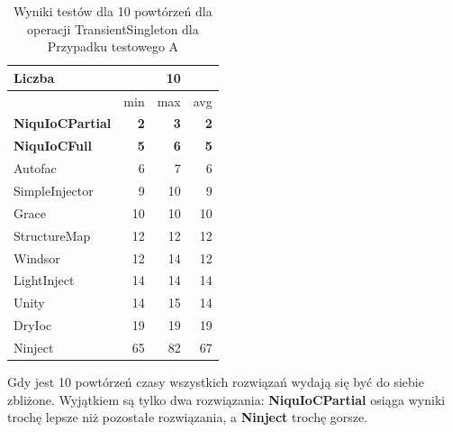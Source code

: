 \documentclass[12pt]{article}
\begin{document}
\begin{table}[H]
\captionsetup{belowskip=0pt,aboveskip=0pt}
\begin{center}
\begin{small}
	\begin{tabular}{ | l | r r r | }
    		\hline
Liczba & & 10 & \\ \hline
 & min & max & avg \\ \hline
\textbf{NiquIoCPartial} & \textbf{2} & \textbf{3} & \textbf{2} \\ \hline
\textbf{NiquIoCFull} & \textbf{5} & \textbf{6} & \textbf{5} \\ \hline
Autofac & 6 & 7 & 6 \\ \hline
SimpleInjector & 9 & 10 & 9 \\ \hline
Grace & 10 & 10 & 10 \\ \hline
StructureMap & 12 & 12 & 12 \\ \hline
Windsor & 12 & 14 & 12 \\ \hline
LightInject & 14 & 14 & 14 \\ \hline
Unity & 14 & 15 & 14 \\ \hline
DryIoc & 19 & 19 & 19 \\ \hline
Ninject & 65 & 82 & 67 \\ \hline
  	\end{tabular}
\end{small}
\end{center}
\caption{Wyniki testów dla 10 powtórzeń dla operacji TransientSingleton dla Przypadku testowego A}
\label{TestCaseA_TransientSingleton10}
\end{table}
Gdy jest 10 powtórzeń czasy wszystkich rozwiązań wydają się być do siebie zbliżone. Wyjątkiem są tylko dwa rozwiązania: \textbf{NiquIoCPartial} osiąga wyniki trochę lepsze niż pozostałe rozwiązania, a \textbf{Ninject} trochę gorsze.
\\ \\
\end{document}
